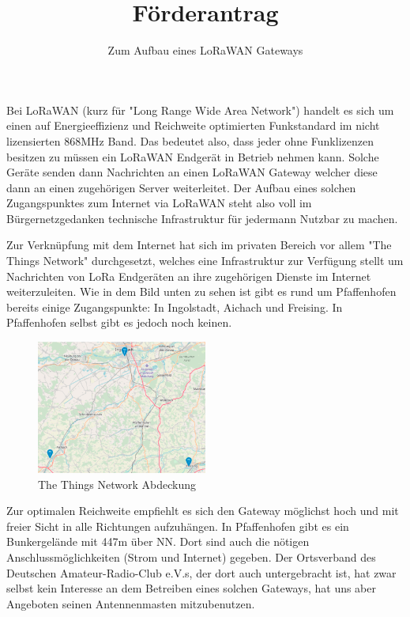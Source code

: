 \documentclass[11pt]{article}
\title{\textbf{Förderantrag}}
\author{Zum Aufbau eines LoRaWAN Gateways}
\date{}
\begin{document}
\maketitle

Bei LoRaWAN (kurz für "Long Range Wide Area Network") handelt es sich um einen auf Energieeffizienz und Reichweite optimierten Funkstandard im nicht lizensierten 868MHz Band. Das bedeutet also, dass jeder ohne Funklizenzen besitzen zu müssen ein LoRaWAN Endgerät in Betrieb nehmen kann. Solche Geräte senden dann Nachrichten an einen LoRaWAN Gateway welcher diese dann an einen zugehörigen Server weiterleitet.
Der Aufbau eines solchen Zugangspunktes zum Internet via LoRaWAN steht also voll im Bürgernetzgedanken technische Infrastruktur für jedermann Nutzbar zu machen.

Zur Verknüpfung mit dem Internet hat sich im privaten Bereich vor allem "The Things Network" durchgesetzt, welches eine Infrastruktur zur Verfügung stellt um Nachrichten von LoRa Endgeräten an ihre zugehörigen Dienste im Internet weiterzuleiten. Wie in dem Bild unten zu sehen ist gibt es rund um Pfaffenhofen bereits einige Zugangspunkte: In Ingolstadt, Aichach und Freising. In Pfaffenhofen selbst gibt es jedoch noch keinen.

\begin{figure}[h]
	\begin{center}
		\includegraphics[width=0.5\textwidth]{ttn_paf}
	\end{center}
	\label{fig:ttnmap}
	\caption{The Things Network Abdeckung}
\end{figure}

Zur optimalen Reichweite empfiehlt es sich den Gateway möglichst hoch und mit freier Sicht in alle Richtungen aufzuhängen. In Pfaffenhofen gibt es ein Bunkergelände mit 447m über NN. Dort sind auch die nötigen Anschlussmöglichkeiten (Strom und Internet) gegeben. Der Ortsverband des Deutschen Amateur-Radio-Club e.V.s, der dort auch untergebracht ist, hat zwar selbst kein Interesse an dem Betreiben eines solchen Gateways, hat uns aber Angeboten seinen Antennenmasten mitzubenutzen.
\end{document}
